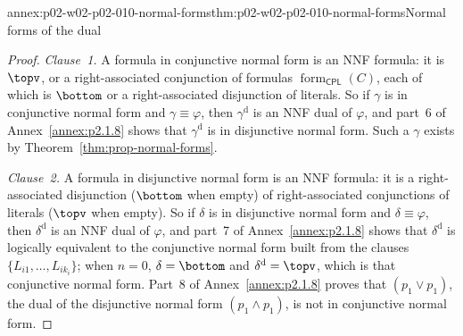 \begin{annexitem}{annex:p02-w02-p02-010-normal-forms}{thm:p02-w02-p02-010-normal-forms}{Normal forms of the dual}
\begin{proof}
\emph{Clause~1.}  A formula in conjunctive normal form is an NNF formula: it
is \(\topv\), or a right-associated conjunction of formulas
\(\operatorname{form}_{\mathsf{CPL}}(C)\), each of which is \(\bottom\) or a
right-associated disjunction of literals.  So if \(\gamma\) is in conjunctive
normal form and \(\gamma\equiv\varphi\), then \(\gamma^{\mathrm d}\) is an NNF
dual of \(\varphi\), and part~6 of Annex~\ref{annex:p2.1.8} shows that
\(\gamma^{\mathrm d}\) is in disjunctive normal form.  Such a \(\gamma\)
exists by Theorem~\ref{thm:prop-normal-forms}.

\emph{Clause~2.}  A formula in disjunctive normal form is an NNF formula: it is
a right-associated disjunction (\(\bottom\) when empty) of right-associated
conjunctions of literals (\(\topv\) when empty).  So if \(\delta\) is in
disjunctive normal form and \(\delta\equiv\varphi\), then
\(\delta^{\mathrm d}\) is an NNF dual of \(\varphi\), and part~7 of
Annex~\ref{annex:p2.1.8} shows that \(\delta^{\mathrm d}\) is logically
equivalent to the conjunctive normal form built from the clauses
\(\{L_{i1},\ldots,L_{ik_i}\}\); when \(n=0\), \(\delta=\bottom\) and
\(\delta^{\mathrm d}=\topv\), which is that conjunctive normal form.  Part~8 of
Annex~\ref{annex:p2.1.8} proves that \((p_1\lor p_1)\), the dual of the
disjunctive normal form \((p_1\land p_1)\), is not in conjunctive normal form.
\end{proof}
\end{annexitem}
